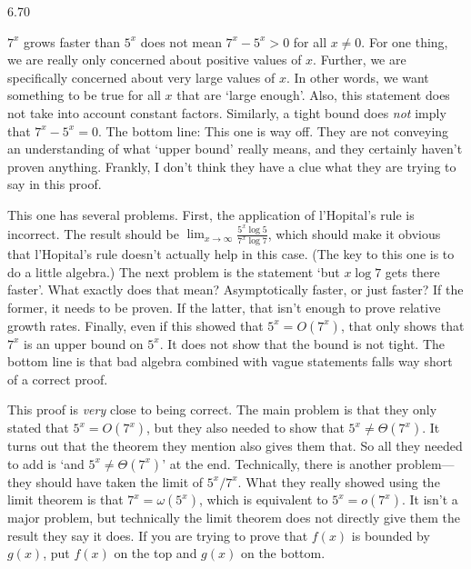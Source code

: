 \begin{Answer}{6.70}
\begin{pfevalenum}
\item
$7^x$ grows faster than $5^x$ does not mean $7^x-5^x>0$ for all $x\neq 0$.
For one thing,
we are really only concerned about positive values of $x$.
Further, we are specifically concerned about very large values of $x$.
In other words, we want something to be true for all $x$ that are `large enough'.
Also, this statement does not take into account constant factors.
Similarly, a tight bound does {\em not} imply that $7^x-5^x=0$.
The bottom line:  This one is way off.  They are not conveying an understanding of
what `upper bound' really means, and they certainly haven't proven anything.
Frankly, I don't think they have a clue what they are trying to say in this proof.
\item
This one has several problems.  First, the application of l'Hopital's rule is incorrect.
The result should be $\displaystyle\lim_{x\rightarrow \infty}\frac{5^x\log 5}{7^x\log 7}$,
which should make it obvious that l'Hopital's rule doesn't actually help in this case.
(The key to this one is to do a little algebra.)
The next problem is the statement `but $x\log 7$ gets there faster'.
What exactly does that mean?
Asymptotically faster, or just faster?  If the former, it needs to be proven.  If the latter, that isn't enough to prove relative growth rates.  Finally, even if this showed that $5^x=O(7^x)$, that only shows
that $7^x$ is an upper bound on $5^x$.  It does not show that the bound is not tight.
The bottom line is that bad algebra combined with vague statements falls way short of
a correct proof.
\item
This proof is {\em very} close to being correct.  The main problem is that they only stated
that $5^x=O(7^x)$, but they also needed to show that $5^x\neq\Theta(7^x)$.  It turns out that the
theorem they mention also gives them that. So all they needed to add is `and $5^x\neq \Theta(7^x)$' at the end.
Technically, there is another problem---they should have taken the limit of $5^x/7^x$.  What they really showed
using the limit theorem is that $7^x=\omega(5^x)$, which is equivalent to $5^x=o(7^x)$.  It isn't a major problem,
but technically the limit theorem does not directly give them the result they say it does.
If you are trying to prove that $f(x)$ is bounded by $g(x)$, put $f(x)$ on the top and $g(x)$ on the bottom.
\end{pfevalenum}
\end{Answer}
